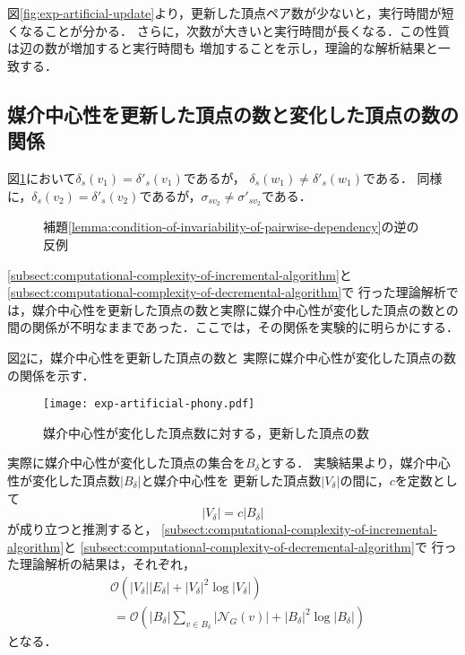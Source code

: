 図\ref{fig:exp-artificial-update}より，更新した頂点ペア数が少ないと，実行時間が短くなることが分かる．
さらに，次数が大きいと実行時間が長くなる．この性質は辺の数が増加すると実行時間も
増加することを示し，理論的な解析結果と一致する．

\subsection{媒介中心性を更新した頂点の数と変化した頂点の数の関係}

\begin{example}
  \label{ex:counter-of-invariability-of-pairwise-dependency}
  図\ref{fig:pd-invariability-counterexample}において$\delta_s(v_1)=\delta'_s(v_1)$であるが，
  $\delta_s(w_1)\neq\delta'_s(w_1)$である．
  同様に，$\delta_s(v_2)=\delta'_s(v_2)$であるが，$\sigma_{sv_2}\neq\sigma'_{sv_2}$である．

  \begin{figure}[tb]
    \centering
    \def\svgwidth{.45\linewidth}
    
    \caption{補題\ref{lemma:condition-of-invariability-of-pairwise-dependency}の逆の反例}
    \label{fig:pd-invariability-counterexample}
  \end{figure}
\end{example}

\ref{subsect:computational-complexity-of-incremental-algorithm}と
\ref{subsect:computational-complexity-of-decremental-algorithm}で
行った理論解析では，媒介中心性を更新した頂点の数と実際に媒介中心性が変化した頂点の数との
間の関係が不明なままであった．ここでは，その関係を実験的に明らかにする．

図\ref{fig:exp-artificial-phony}に，媒介中心性を更新した頂点の数と
実際に媒介中心性が変化した頂点の数の関係を示す．

\begin{figure}[tb]
  \centering
  \texttt{[image: exp-artificial-phony.pdf]}
  \caption{媒介中心性が変化した頂点数に対する，更新した頂点の数}
  \label{fig:exp-artificial-phony}
\end{figure}

実際に媒介中心性が変化した頂点の集合を$B_\delta$とする．
実験結果より，媒介中心性が変化した頂点数$\lvert B_\delta\rvert$と媒介中心性を
更新した頂点数$\lvert V_\delta\rvert$の間に，$c$を定数として
\[ \lvert V_\delta\rvert=c\lvert B_\delta\rvert \]
が成り立つと推測すると，
\ref{subsect:computational-complexity-of-incremental-algorithm}と
\ref{subsect:computational-complexity-of-decremental-algorithm}で
行った理論解析の結果は，それぞれ，
\begin{equation*}
  \begin{aligned}
    &\mathcal{O}(\lvert V_\delta\rvert\lvert E_\delta\rvert+\lvert V_\delta\rvert^2\log\lvert V_\delta\rvert) \\
    &\:=\mathcal{O}(\lvert B_\delta\rvert\sum_{v\in B_\delta}\lvert\mathcal{N}_G(v)\rvert+\lvert B_\delta\rvert^2\log\lvert B_\delta\rvert)
  \end{aligned}
\end{equation*}
となる．

